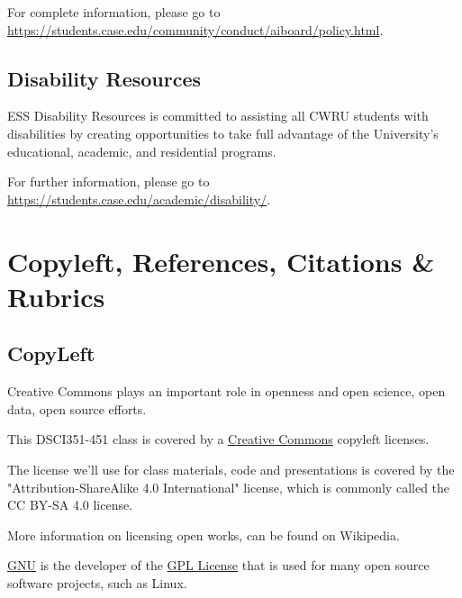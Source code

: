 \documentclass[11pt]{article} %
\begin{document}
    For complete information, please go to \href{"https://students.case.edu/community/conduct/aiboard/policy.html"}{https://students.case.edu/community/conduct/aiboard/policy.html}. 
  
  \subsection{Disability Resources}
  
    ESS Disability Resources is committed to assisting all CWRU students with disabilities by creating opportunities to take full advantage of the University's educational, academic, and residential programs.  
    
    For further information, please go to \href{"https://students.case.edu/academic/disability/''}{https://students.case.edu/academic/disability/}. 


\section{Copyleft, References, Citations  \& Rubrics}

  \subsection{CopyLeft}
  
    Creative Commons plays an important role in openness and open science, open data, open source efforts. 
    
    This DSCI351-451 class \cite{french_dsci351-451:_2016} is covered by a \href{"http://creativecommons.org/licenses/"}{Creative Commons}  \cite{commons_creative_2014} copyleft licenses. 
    
    The license we'll use for class materials, code and presentations is covered by  the "Attribution-ShareAlike 4.0 International" license, which is commonly called the CC BY-SA 4.0 license. \cite{_creative_2015}
       
    More information on licensing open works, can be found on Wikipedia. \cite{commons_creative_2014-1}
    
    \href{"http://www.gnu.org/copyleft/gpl.html"}{GNU} \cite{gnu_gnu.org_2014} is the developer of the \href{"http://en.wikipedia.org/wiki/GNU_General_Public_License"}{GPL License} \cite{gpl_gnu_2014}  that is used for many open source software projects, such as Linux. 
  
\end{document}
